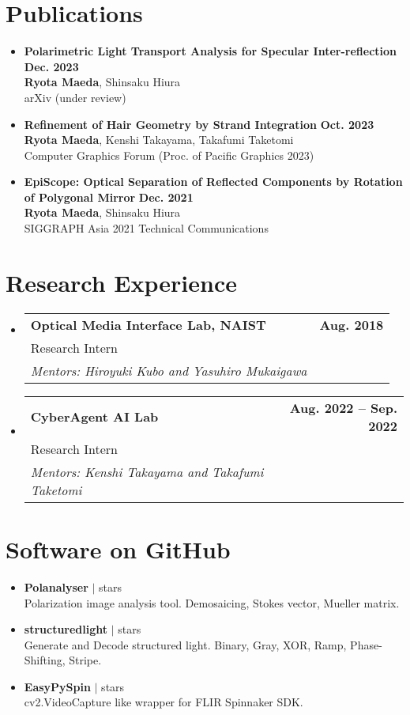 \documentclass[letterpaper,11pt]{article}
\makeatletter
\newcommand{\resumeSubheadingWithAdvisor}[4]{
  \vspace{-2pt}\item
    \begin{tabular*}{1.0\textwidth}[t]{l@{\extracolsep{\fill}}r}
      \textbf{#1} & \textbf{\small #2} \\
      {\small#3} &  \\
      \textit{\small#4} &  \\
    \end{tabular*}\vspace{-7pt}
}
\newcommand{\resumePublicationHeading}[4]{
    \item 
    \small 
    \textbf{#1} \hfill \textbf{#2}\\
    #3\\
    #4 
}
\newcommand{\resumeSoftwareHeading}[3]{
    \item 
    \small 
    \textbf{#1} $|$ \raisebox{0.09\height}{\scriptsize \faIcon[regular]{star}\hspace{0.5ex}}#2 stars\\
    #3 
}
\newcommand{\resumeSubHeadingListStart}{\begin{itemize}[leftmargin=0.0in, label={}]}
\newcommand{\resumeSubHeadingListEnd}{\end{itemize}}
\makeatother
\begin{document}
\section{Publications}
    \resumeSubHeadingListStart
        \resumePublicationHeading
            {Polarimetric Light Transport Analysis for Specular Inter-reflection}{Dec. 2023}
            {\textbf{Ryota Maeda}, Shinsaku Hiura}
            {arXiv (under review)}
        \resumePublicationHeading
            {Refinement of Hair Geometry by Strand Integration}{Oct. 2023}
            {\textbf{Ryota Maeda}, Kenshi Takayama, Takafumi Taketomi}
            {Computer Graphics Forum (Proc. of Pacific Graphics 2023)}
        \resumePublicationHeading
            {EpiScope: Optical Separation of Reflected Components by Rotation of Polygonal Mirror}{Dec. 2021}
            {\textbf{Ryota Maeda}, Shinsaku Hiura}
            {SIGGRAPH Asia 2021 Technical Communications}
    \resumeSubHeadingListEnd

\section{Research Experience}
    \resumeSubHeadingListStart
        \resumeSubheadingWithAdvisor
            {Optical Media Interface Lab, NAIST}{Aug. 2018}
            {Research Intern}
            {Mentors: Hiroyuki Kubo and Yasuhiro Mukaigawa}
        \resumeSubheadingWithAdvisor
            {CyberAgent AI Lab}{Aug. 2022 -- Sep. 2022}
            {Research Intern}
            {Mentors: Kenshi Takayama and Takafumi Taketomi}
    \resumeSubHeadingListEnd

\section{Software on GitHub}
    \resumeSubHeadingListStart
        \resumeSoftwareHeading
            {Polanalyser}{}
            {Polarization image analysis tool. Demosaicing, Stokes vector, Mueller matrix.}
        \resumeSoftwareHeading
            {structuredlight}{}
            {Generate and Decode structured light. Binary, Gray, XOR, Ramp, Phase-Shifting, Stripe.}
        \resumeSoftwareHeading
            {EasyPySpin}{}
            {cv2.VideoCapture like wrapper for FLIR Spinnaker SDK.}
    \resumeSubHeadingListEnd
\vspace{-15pt}
\end{document}
